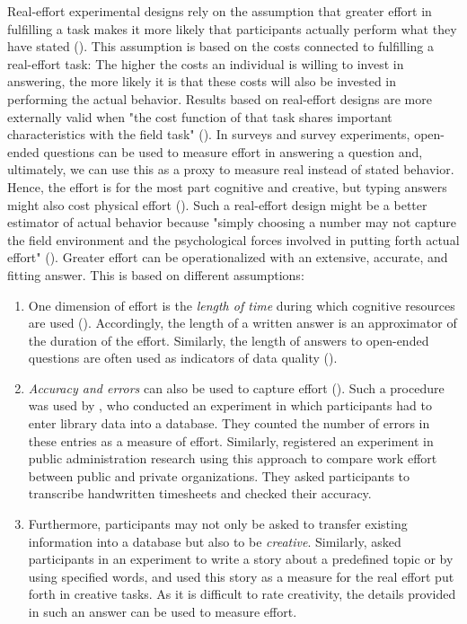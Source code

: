 \documentclass[twocolumn, serif, empirical, authordate]{jote-article}
\begin{document}
Real-effort experimental designs rely on the assumption that greater effort in fulfilling a task makes it more likely that participants actually perform what they have stated (). This assumption is based on the costs connected to fulfilling a real-effort task: The higher the costs an individual is willing to invest in answering, the more likely it is that these costs will also be invested in performing the actual behavior. Results based on real-effort designs are more externally valid when "the cost function of that task shares important characteristics with the field task" (). In surveys and survey experiments, open-ended questions can be used to measure effort in answering a question and, ultimately, we can use this as a proxy to measure real instead of stated behavior. Hence, the effort is for the most part cognitive and creative, but typing answers might also cost physical effort (). Such a real-effort design might be a better estimator of actual behavior because "simply choosing a number may not capture the field environment and the psychological forces involved in putting forth actual effort" (). Greater effort can be operationalized with an extensive, accurate, and fitting answer. This is based on different assumptions: \begin{enumerate} \def\labelenumi{\arabic{enumi}.} \item One dimension of effort is the \emph{length of time} during which cognitive resources are used ().
 Accordingly, the length of a written answer is an approximator of the duration of the effort. Similarly, the length of answers to open-ended questions are often used as indicators of data quality ().
\item \emph{Accuracy and errors} can also be used to capture effort (). Such a procedure was used by \textcite{Gneezy2006}, who conducted an experiment in which participants had to enter library data into a database. They counted the number of errors in these entries as a measure of effort. Similarly, \textcite{Andersen2018} registered an experiment in public administration research using this approach to compare work effort between public and private organizations. They asked participants to transcribe handwritten timesheets and checked their accuracy.
\item Furthermore, participants may not only be asked to transfer existing information into a database but also to be \emph{creative}. Similarly, \textcite{Charness2018} asked participants in an experiment to write a story about a predefined topic or by using specified words, and used this story as a measure for the real effort put forth in creative tasks. As it is difficult to rate creativity, the details provided in such an answer can be used to measure effort.
\end{enumerate} 
\end{document}
